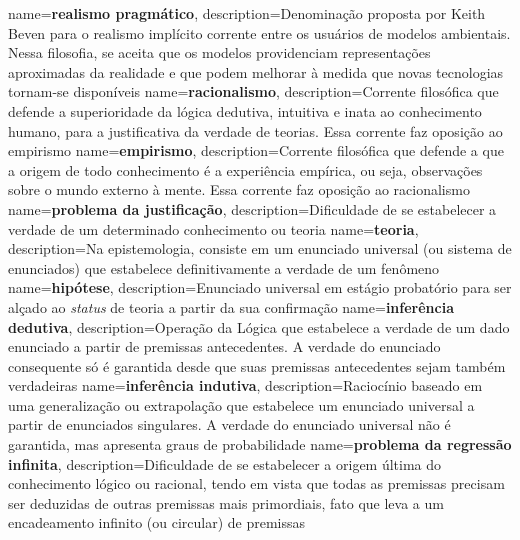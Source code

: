 \makeglossaries

{
    name=\textbf{realismo pragmático},
    description={Denominação proposta por Keith Beven para o realismo implícito corrente entre os usuários de modelos ambientais. Nessa filosofia, se aceita que os modelos providenciam representações aproximadas da realidade e que podem melhorar à medida que novas tecnologias tornam-se disponíveis}
}
{
    name=\textbf{racionalismo},
    description={Corrente filosófica que defende a superioridade da lógica dedutiva, intuitiva e inata ao conhecimento humano, para a justificativa da verdade de teorias. Essa corrente faz oposição ao empirismo}
}
{
    name=\textbf{empirismo},
    description={Corrente filosófica que defende a que a origem de todo conhecimento é a experiência empírica, ou seja, observações sobre o mundo externo à mente. Essa corrente faz oposição ao racionalismo}
}
{
    name=\textbf{problema da justificação},
    description={Dificuldade de se estabelecer a verdade de um determinado conhecimento ou teoria}
}
{
    name=\textbf{teoria},
    description={Na epistemologia, consiste em um enunciado universal (ou sistema de enunciados) que estabelece definitivamente a verdade de um fenômeno}
}
{
    name=\textbf{hipótese},
    description={Enunciado universal em estágio probatório para ser alçado ao \textit{status} de teoria a partir da sua confirmação}
}
{
    name=\textbf{inferência dedutiva},
    description={Operação da Lógica que estabelece a verdade de um dado enunciado a partir de premissas antecedentes. A verdade do enunciado consequente só é garantida desde que suas premissas antecedentes sejam também verdadeiras}
}
{
    name=\textbf{inferência indutiva},
    description={Raciocínio baseado em uma generalização ou extrapolação que estabelece um enunciado universal a partir de enunciados singulares. A verdade do enunciado universal não é garantida, mas apresenta graus de probabilidade}
}
{
    name=\textbf{problema da regressão infinita},
    description={Dificuldade de se estabelecer a origem última do conhecimento lógico ou racional, tendo em vista que todas as premissas precisam ser deduzidas de outras premissas mais primordiais, fato que leva a um encadeamento infinito (ou circular) de premissas}
}
